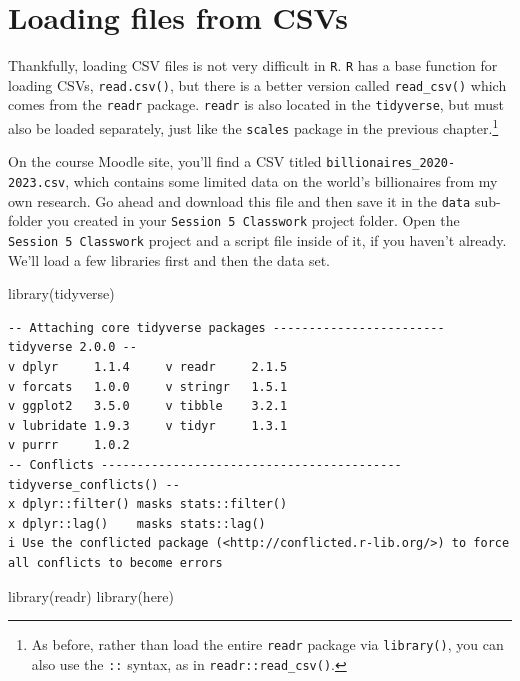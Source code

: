 \documentclass[
  letterpaper,
]{book}
\newenvironment{Shaded}{\begin{snugshade}}{\end{snugshade}}
\newcommand{\FunctionTok}[1]{\textcolor[rgb]{0.28,0.35,0.67}{#1}}
\newcommand{\NormalTok}[1]{\textcolor[rgb]{0.00,0.23,0.31}{#1}}
\begin{document}
\hypertarget{loading-files-from-csvs}{%
\section{Loading files from CSVs}\label{loading-files-from-csvs}}

Thankfully, loading CSV files is not very difficult in \texttt{R}.
\texttt{R} has a base function for loading CSVs, \texttt{read.csv()},
but there is a better version called \texttt{read\_csv()} which comes
from the \texttt{readr} package. \texttt{readr} is also located in the
\texttt{tidyverse}, but must also be loaded separately, just like the
\texttt{scales} package in the previous chapter.\footnote{As before,
  rather than load the entire \texttt{readr} package via
  \texttt{library()}, you can also use the \texttt{::} syntax, as in
  \texttt{readr::read\_csv()}.}

On the course Moodle site, you'll find a CSV titled
\texttt{billionaires\_2020-2023.csv}, which contains some limited data
on the world's billionaires from my own research. Go ahead and download
this file and then save it in the \texttt{data} sub-folder you created
in your \texttt{Session\ 5\ Classwork} project folder. Open the
\texttt{Session\ 5\ Classwork} project and a script file inside of it,
if you haven't already. We'll load a few libraries first and then the
data set.

\begin{Shaded}
\begin{Highlighting}[]
\FunctionTok{library}\NormalTok{(tidyverse)}
\end{Highlighting}
\end{Shaded}

\begin{verbatim}
-- Attaching core tidyverse packages ------------------------ tidyverse 2.0.0 --
v dplyr     1.1.4     v readr     2.1.5
v forcats   1.0.0     v stringr   1.5.1
v ggplot2   3.5.0     v tibble    3.2.1
v lubridate 1.9.3     v tidyr     1.3.1
v purrr     1.0.2     
-- Conflicts ------------------------------------------ tidyverse_conflicts() --
x dplyr::filter() masks stats::filter()
x dplyr::lag()    masks stats::lag()
i Use the conflicted package (<http://conflicted.r-lib.org/>) to force all conflicts to become errors
\end{verbatim}

\begin{Shaded}
\begin{Highlighting}[]
\FunctionTok{library}\NormalTok{(readr)}
\FunctionTok{library}\NormalTok{(here)}
\end{Highlighting}
\end{Shaded}
\end{document}
